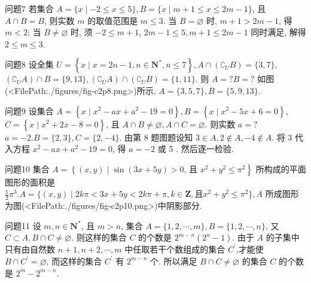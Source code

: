 问题7 若集合 $A=\{x \mid-2 \leqslant x \leqslant 5\}, B=\{x \mid m+1 \leqslant x \leqslant 2 m-1\}$, 且 $A \cap B=B$, 则实数 $m$ 的取值范围是
$m \leqslant 3$. 当 $B=\varnothing$ 时, $m+1>2 m-1$, 得 $m<2$; 当 $B \neq \varnothing$ 时, 须 $-2 \leqslant m+1$, $2 m-1 \leqslant 5, m+1 \leqslant 2 m-1$ 同时满足, 解得 $2 \leqslant m \leqslant 3$.



问题8 设全集 $U=\left\{x \mid x=2 n-1, n \in \mathbf{N}^*, n \leqslant 7\right\}, A \cap\left(\complement_U B\right)=\{3,7\}$, $\left(\complement_U A\right) \cap B=\{9,13\},\left(\complement_U A\right) \cap\left(\complement_U B\right)=\{1,11\}$. 则 $A=? B=?$
如图(<FilePath:./figures/fig-c2p8.png>)所示,
$A=\{3,5,7\}, B=\{5,9,13\}$.



问题9 设集合 $A=\left\{x \mid x^2-a x+a^2-19=0\right\}, B=\left\{x \mid x^2-5 x+6=0\right\}$, $C=\left\{x \mid x^2+2 x-8=0\right\}$, 且 $A \cap B \neq \varnothing, A \cap C=\varnothing$. 则实数 $a=?$
$a=-2 . B=\{2,3\}, C=\{2,-4\}$. 由第 8 题图题设知 $3 \in A, 2 \notin A,-4 \notin A$. 将 3 代入方程 $x^2-a x+a^2-19=0$, 得 $a=-2$ 或 5 . 然后逐一检验.



问题10 集合 $A=\left\{(x, y) \mid \sin (3 x+5 y)>0\right.$, 且 $\left.x^2+y^2 \leqslant \pi^2\right\}$ 所构成的平面图形的面积是
$\frac{1}{2} \pi^3 . A=\{(x, y) \mid 2 k \pi<3 x+ 5 y<2 k \pi+\pi, k \in \mathbf{Z}, \text{且} x^2+y^2 \leqslant \pi^2\}, A$ 所成图形为图(<FilePath:./figures/fig-c2p10.png>)中阴影部分.



问题11 设 $m, n \in \mathbf{N}^*$, 且 $m>n$, 集合 $A=\{1,2, \cdots, m\}, B=\{1,2, \cdots, n\}$, 又 $C \subset A, B \cap C \neq \varnothing$. 则这样的集合 $C$ 的个数是
$2^{m-n}\left(2^n-1\right)$. 由于 $A$ 的子集中只有由自然数 $n+1, n+2, \cdots, m$ 中任取若干个数组成的集合 $C^{\prime}$,才能使 $B \cap C^{\prime}=\varnothing$, 而这样的集合 $C^{\prime}$ 有 $2^{m-n}$ 个.
所以满足 $B \cap C \neq \varnothing$ 的集合 $C$ 的个数是 $2^m-2^{m-n}$.



